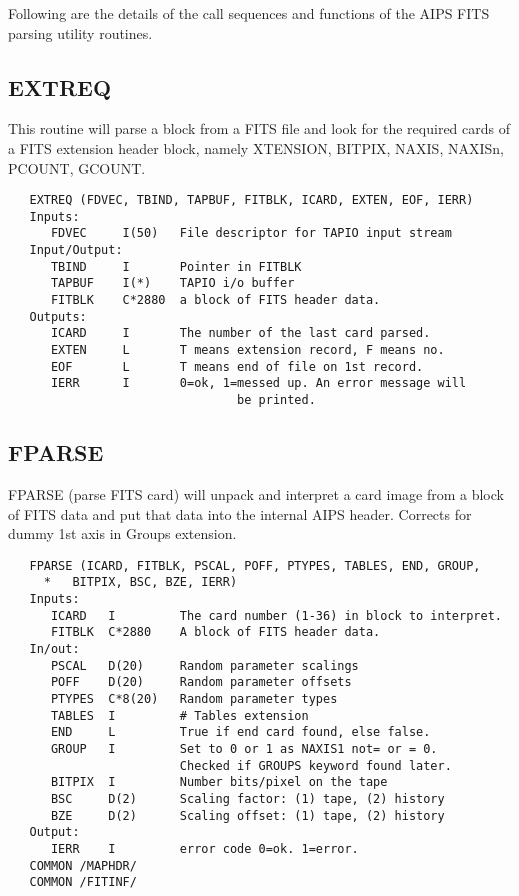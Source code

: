 Following are the details of the call sequences and functions of the
AIPS FITS parsing utility routines.

\subsection{EXTREQ}
This routine will parse a block from a FITS file and look for the
required cards of a FITS extension header block, namely XTENSION,
BITPIX, NAXIS, NAXISn, PCOUNT, GCOUNT.
\begin{verbatim}
   EXTREQ (FDVEC, TBIND, TAPBUF, FITBLK, ICARD, EXTEN, EOF, IERR)
   Inputs:
      FDVEC     I(50)   File descriptor for TAPIO input stream
   Input/Output:
      TBIND     I       Pointer in FITBLK
      TAPBUF    I(*)    TAPIO i/o buffer
      FITBLK    C*2880  a block of FITS header data.
   Outputs:
      ICARD     I       The number of the last card parsed.
      EXTEN     L       T means extension record, F means no.
      EOF       L       T means end of file on 1st record.
      IERR      I       0=ok, 1=messed up. An error message will
                                be printed.
\end{verbatim}

\subsection{FPARSE}
FPARSE (parse FITS card) will unpack and interpret a card image
from a block of FITS data and put that data into the internal AIPS
header.  Corrects for dummy 1st axis in Groups extension.
\begin{verbatim}
   FPARSE (ICARD, FITBLK, PSCAL, POFF, PTYPES, TABLES, END, GROUP,
     *   BITPIX, BSC, BZE, IERR)
   Inputs:
      ICARD   I         The card number (1-36) in block to interpret.
      FITBLK  C*2880    A block of FITS header data.
   In/out:
      PSCAL   D(20)     Random parameter scalings
      POFF    D(20)     Random parameter offsets
      PTYPES  C*8(20)   Random parameter types
      TABLES  I         # Tables extension
      END     L         True if end card found, else false.
      GROUP   I         Set to 0 or 1 as NAXIS1 not= or = 0.
                        Checked if GROUPS keyword found later.
      BITPIX  I         Number bits/pixel on the tape
      BSC     D(2)      Scaling factor: (1) tape, (2) history
      BZE     D(2)      Scaling offset: (1) tape, (2) history
   Output:
      IERR    I         error code 0=ok. 1=error.
   COMMON /MAPHDR/
   COMMON /FITINF/
\end{verbatim}

